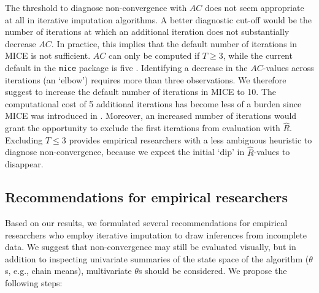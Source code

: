 \documentclass[Royal,times,sageh]{sagej}
\begin{document}
The threshold to diagnose non-convergence with \(AC\) does not seem appropriate at all in iterative imputation algorithms. A better diagnostic cut-off would be the number of iterations at which an additional iteration does not substantially decrease \(AC\). In practice, this implies that the default number of iterations in MICE is not sufficient. \(AC\) can only be computed if \(T\geq3\), while the current default in the \texttt{mice} package is five \citep{mice}. Identifying a decrease in the \(AC\)-values across iterations (an `elbow') requires more than three observations. We therefore suggest to increase the default number of iterations in MICE to 10. The computational cost of 5 additional iterations has become less of a burden since MICE was introduced in \citeyearpar{mice}. Moreover, an increased number of iterations would grant the opportunity to exclude the first iterations from evaluation with \(\widehat{R}\). Excluding \(T\leq3\) provides empirical researchers with a less ambiguous heuristic to diagnose non-convergence, because we expect the initial `dip' in \(\widehat{R}\)-values to disappear.

\hypertarget{recommendations-for-empirical-researchers}{%
\subsection{Recommendations for empirical researchers}\label{recommendations-for-empirical-researchers}}

Based on our results, we formulated several recommendations for empirical researchers who employ iterative imputation to draw inferences from incomplete data. We suggest that non-convergence may still be evaluated visually, but in addition to inspecting univariate summaries of the state space of the algorithm (\(\theta\)s, e.g., chain means), multivariate \(\theta\)s should be considered. We propose the following steps:
\end{document}
